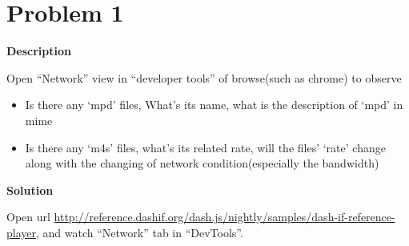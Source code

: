 \documentclass[12pt,letterpaper]{ctexart}
\begin{document}
\section*{Problem 1}

{\bf Description}

Open ``Network'' view in ``developer tools'' of browse(such as chrome) to observe
\begin{itemize}
  \item Is there any `mpd' files, What’s its name, what is the description of `mpd' in mime
  \item Is there any `m4s' files, what’s its related rate, will the files’ `rate' change along with the changing of network condition(especially the bandwidth)
\end{itemize}


{\bf Solution}

Open url \href{http://reference.dashif.org/dash.js/nightly/samples/dash-if-reference-player}{http://reference.dashif.org/dash.js/nightly/samples/dash-if-reference-player},
and watch ``Network'' tab in ``DevTools''.
\end{document}
